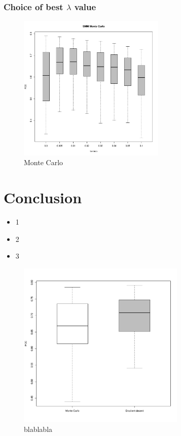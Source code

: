 \documentclass[presentation]{beamer}   %
\begin{document}
\begin{frame}[plain]
  \frametitle{Choice of best $\lambda$ value}
	\begin{figure}
		\centering
		\includegraphics[width=70mm,height=70mm]{fig/choice_lambda_mc.pdf}
		\caption{Monte Carlo}
	\end{figure}
\end{frame}

\section{Conclusion}
\begin{frame}
\begin{itemize}
\item 1 \pause
\item 2 \pause
\item 3
\end{itemize}
\end{frame}
\begin{frame}[plain]
	\begin{figure}
	\centering
	\includegraphics[width=80mm,height=80mm]{fig/boxplot.pdf}
	\caption{blablabla}
	\end{figure}
\end{frame}
\end{document}

